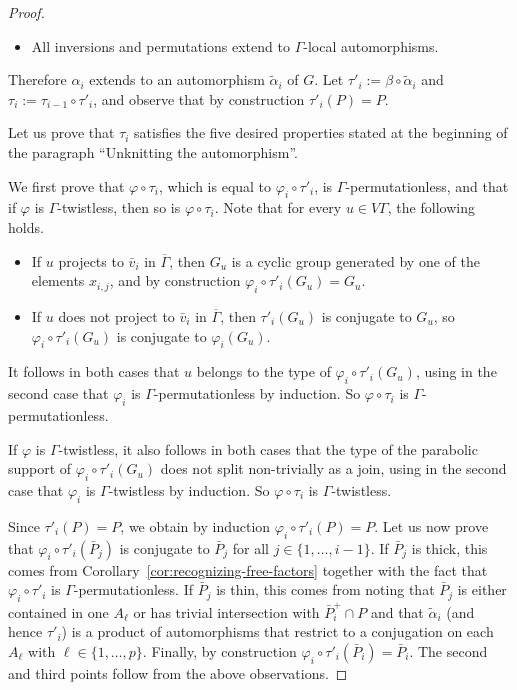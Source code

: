 \documentclass[a4paper,english,11pt]{article}
\theoremstyle{definition}
\theoremstyle{remark}
\begin{document}
\begin{proof}
\begin{itemize}
\item All inversions and permutations extend to $\Gamma$-local automorphisms.
\end{itemize}
Therefore $\alpha_i$ extends to an automorphism $\tilde{\alpha}_i$ of $G$. Let $\tau'_i:=\beta\circ\tilde\alpha_i$ and $\tau_i:=\tau_{i-1}\circ\tau'_i$, and observe that by construction $\tau'_i(P)=P$. 

Let us prove that $\tau_i$ satisfies the five desired properties stated at the beginning of the paragraph “Unknitting the automorphism”. 

We first prove that $\varphi\circ\tau_i$, which is equal to $\varphi_i\circ\tau'_i$, is $\Gamma$-permutationless, and that if $\varphi$ is $\Gamma$-twistless, then so is $\varphi\circ\tau_i$. Note that for every $u\in V\Gamma$, the following holds. 
\begin{itemize}
\item If $u$ projects to $\bar v_i$ in $\overline\Gamma$, then $G_u$ is a cyclic group generated by one of the elements $x_{i,j}$, and by construction $\varphi_i\circ\tau'_i(G_u)=G_u$. 
\item If $u$ does not project to $\bar v_i$ in $\overline\Gamma$, then $\tau'_i(G_u)$ is conjugate to $G_u$, so $\varphi_i\circ\tau'_i(G_u)$ is conjugate to $\varphi_i(G_u)$. 
\end{itemize}
It follows in both cases that $u$ belongs to the type of $\varphi_i\circ\tau'_i(G_u)$, using in the second case that $\varphi_i$ is $\Gamma$-permutationless by induction. So $\varphi\circ\tau_i$ is $\Gamma$-permutationless.

If $\varphi$ is $\Gamma$-twistless, it also follows in both cases that the type of the parabolic support of $\varphi_i\circ\tau'_i(G_u)$ does not split non-trivially as a join, using in the second case that $\varphi_i$ is $\Gamma$-twistless by induction. So $\varphi\circ\tau_i$ is $\Gamma$-twistless.

Since $\tau'_i(P)=P$, we obtain by induction $\varphi_i\circ\tau'_i(P)=P$. 
Let us now prove that $\varphi_i\circ \tau'_i(\bar{P}_j)$ is conjugate to $\bar{P}_j$ for all $j\in\{1,\dots,i-1\}$. If $\bar{P}_j$ is thick, this comes from Corollary~\ref{cor:recognizing-free-factors} together with the fact that $\varphi_i\circ\tau'_i$ is $\Gamma$-permutationless. If $\bar{P}_j$ is thin, this comes from noting that $\bar{P}_j$ is either contained in one $A_\ell$ or has trivial intersection with $\bar{P}^+_i\cap P$ and that $\tilde\alpha_i$ (and hence $\tau'_i$) is a product of automorphisms that restrict to a conjugation on each $A_\ell$ with $\ell\in\{1,\dots,p\}$. Finally, by construction $\varphi_i\circ \tau'_i(\bar{P}_i)=\bar{P}_i$. The second and third points follow from the above observations.
\end{proof}
\end{document}
